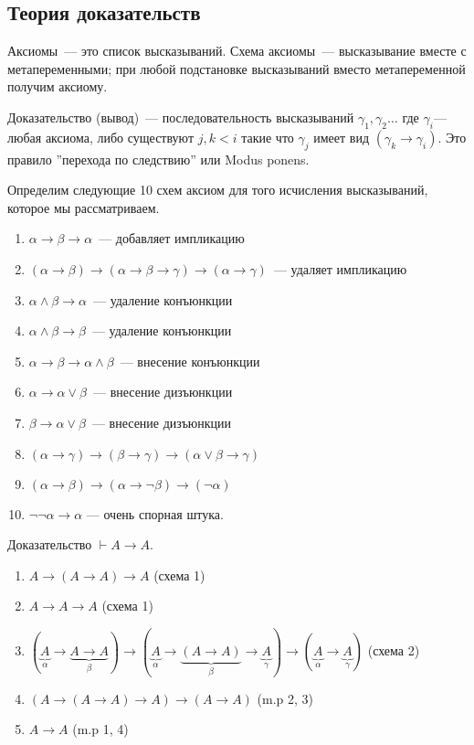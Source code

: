 \subsection{Теория доказательств}
\begin{definition}
    Аксиомы~--- это список высказываний.
    Схема аксиомы~--- высказывание вместе с метапеременными; при любой подстановке высказываний вместо метапеременной получим аксиому. 
\end{definition}

\begin{definition}
    Доказательство (вывод)~--- последовательность высказываний $\gamma_1, \gamma_2\ldots$ где $\gamma_i$--- любая аксиома, 
    либо существуют $j,k < i$ такие что $\gamma_j$ имеет вид $(\gamma_k \to \gamma_i)$.
    Это правило ''перехода по следствию'' или Modus ponens.
\end{definition}

Определим следующие 10 схем аксиом для того исчисления высказываний, которое мы рассматриваем. 
\begin{enumerate}
    \item $\alpha \to \beta \to \alpha$~--- добавляет импликацию
    \item $(\alpha \to \beta) \to (\alpha \to \beta \to \gamma) \to (\alpha \to \gamma)$~--- удаляет импликацию
    \item $\alpha \land \beta \to \alpha$~--- удаление конъюнкции
    \item $\alpha \land \beta \to \beta$~--- удаление конъюнкции
    \item $\alpha \to \beta \to \alpha \land \beta$~--- внесение конъюнкции
    \item $\alpha \to \alpha \lor \beta$~--- внесение дизъюнкции
    \item $\beta \to \alpha \lor \beta$~--- внесение дизъюнкции
    \item $(\alpha \to \gamma) \to (\beta \to \gamma) \to (\alpha \lor \beta \to \gamma)$
    \item $(\alpha \to \beta) \to (\alpha \to \neg \beta) \to (\neg \alpha)$
    \item $\neg \neg \alpha \to \alpha$ --- очень спорная штука.
\end{enumerate}

\begin{example} Доказательство
    $\vdash A \to A $.
    \begin{enumerate}
        \item $A \to (A \to A) \to A$ (схема 1)
        \item $A \to A \to A$  (схема 1)
        \item $(\underbrace{A}_\alpha \to \underbrace{A \to A}_\beta) \to (\underbrace{A}_\alpha \to \underbrace{(A \to A)}_\beta \to \underbrace{A}_\gamma) \to (\underbrace{A}_\alpha \to \underbrace{A}_\gamma)$  (схема 2)
        \item $(A \to (A \to A) \to A) \to (A \to A)$ (m.p 2, 3)
        \item $A \to A$ (m.p 1, 4)
    \end{enumerate}
\end{example}